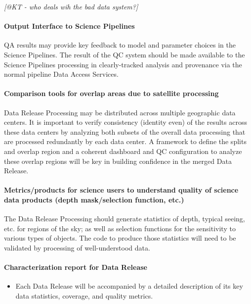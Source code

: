 \emph{[@KT - who deals wih the bad data system?]}

\paragraph{Output Interface to Science Pipelines}
\label{sec:qaOutputInterfaceSciencePipelines}

QA results may provide key feedback to model and parameter choices in the Science Pipelines.  The result of the QC system should be made available to the Science Pipelines processing in clearly-tracked analysis and provenance via the normal pipeline Data Access Services.

\paragraph{Comparison tools for overlap areas due to satellite processing}
\label{sec:qaComparisonSatelliteDataCenters}

Data Release Processing may be distributed across multiple geographic data centers.  It is important to verify consistency (identity even) of the results across these data centers by analyzing both subsets of the overall data processing that are processed redundantly by each data center. A framework to define the splits and overlap region and a coherent dashboard and QC configuration to analyze these overlap regions will be key in building confidence in the merged Data Release.

\paragraph{Metrics/products for science users to understand quality of science data products (depth mask/selection function, etc.)}
\label{sec:qaScienceUsersMetrics}

The Data Release Processing should generate statistics of depth, typical seeing, etc. for regions of the sky; as well as selection functions for the sensitivity to various types of objects.  The code to produce those statistics will need to be validated by processing of well-understood data.

\paragraph{Characterization report for Data Release}
\label{sec:qaCharacterizationReportDrp}
\begin{itemize}
\item Each Data Release will be accompanied by a detailed description of its key data statistics, coverage, and quality metrics.
\end{itemize}

